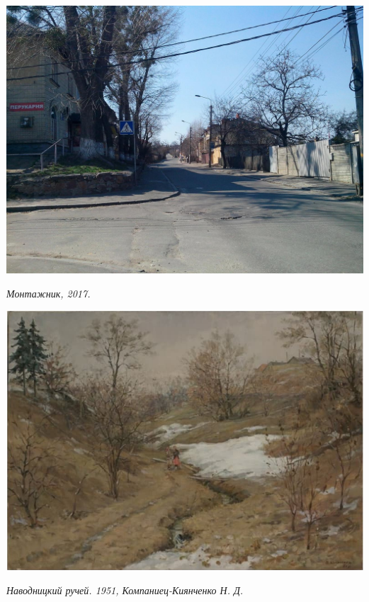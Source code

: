 \begin{center}
\includegraphics[width=0.95\linewidth]{rpix/IMG_20170402_144928.jpg}

\textit{Монтажник, 2017.}
\end{center}



\begin{center}
\includegraphics[width=0.95\linewidth]{rpix/navod.jpg}

\textit{Наводницкий ручей. 1951, Компаниец-Киянченко Н. Д.}
\end{center}


